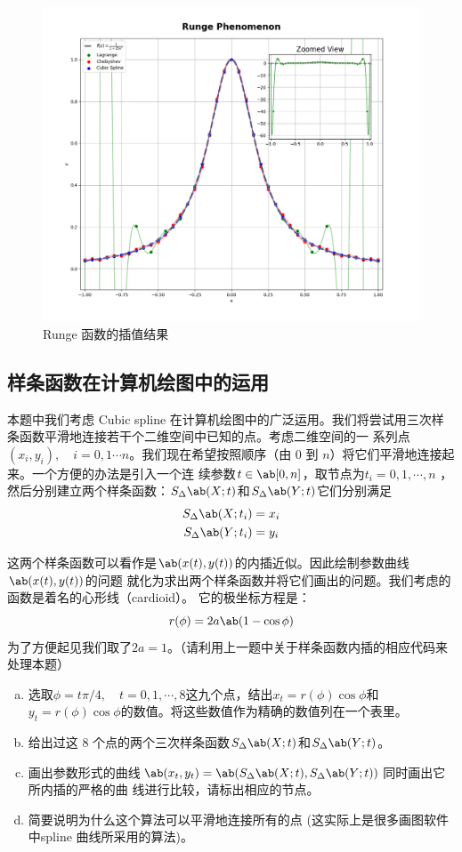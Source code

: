 \documentclass[12pt, a4paper, oneside]{article}
\begin{document}
\begin{figure}[H]
    \centering
    \includegraphics[width=1.0\textwidth]{fig4.png}
    \caption{Runge 函数的插值结果}

\end{figure}

\subsection{样条函数在计算机绘图中的运用}
本题中我们考虑 Cubic spline 在计算机绘图中的广泛运用。我们将尝试用三次样条函数平滑地连接若干个二维空间中已知的点。考虑二维空间的一
系列点$(x_i,y_i),\quad i=0,1\cdots n$。我们现在希望按照顺序（由 $0$ 到 $n$）将它们平滑地连接起来。一个方便的办法是引入一个连
续参数$t\in\ab[0,n]$，取节点为$t_i=0,1,\cdots,n$ ，然后分别建立两个样条函数：$S_\Delta\ab(X;t)$和$S_\Delta\ab(Y;t)$它们分别满足
\begin{align*}
    S_\Delta\ab(X;t_i)&=x_i\\
    S_\Delta\ab(Y;t_i)&=y_i
\end{align*}

这两个样条函数可以看作是$\ab(x(t),y(t))$的内插近似。因此绘制参数曲线$\ab(x(t),y(t))$的问题
就化为求出两个样条函数并将它们画出的问题。我们考虑的函数是着名的心形线（cardioid）。
它的极坐标方程是：
$$r(\phi)=2a\ab(1-\cos\phi)$$
为了方便起见我们取了$2a=1$。（请利用上一题中关于样条函数内插的相应代码来处理本题）
\begin{enumerate}[(a)]
    \item 选取$\phi=t\pi/4,\quad t=0,1,\cdots,8$这九个点，结出$x_t=r(\phi)\cos\phi$和$y_t=r(\phi)\cos\phi$的数值。将这些数值作为精确的数值列在一个表里。
    \item 给出过这 8 个点的两个三次样条函数$S_\Delta\ab(X;t)$和$S_\Delta\ab(Y;t)$。
    \item 画出参数形式的曲线$\ab(x_t, y_t)=\ab(S_\Delta\ab(X;t),S_\Delta\ab(Y;t))$同时画出它所内插的严格的曲
    线进行比较，请标出相应的节点。
    \item 简要说明为什么这个算法可以平滑地连接所有的点 (这实际上是很多画图软件中spline 曲线所采用的算法)。
\end{enumerate}
\end{document}
